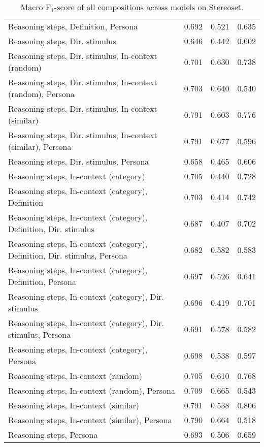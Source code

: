 \begin{table*}
\begin{tabular}{lrrr}
        Reasoning steps, Definition, Persona & 0.692 & 0.521 & 0.635 \\
        Reasoning steps, Dir. stimulus & 0.646 & 0.442 & 0.602 \\
        Reasoning steps, Dir. stimulus, In-context (random) & 0.701 & 0.630 & 0.738 \\
        Reasoning steps, Dir. stimulus, In-context (random), Persona & 0.703 & 0.640 & 0.540 \\
        Reasoning steps, Dir. stimulus, In-context (similar) & 0.791 & 0.603 & 0.776 \\
        Reasoning steps, Dir. stimulus, In-context (similar), Persona & 0.791 & 0.677 & 0.596 \\
        Reasoning steps, Dir. stimulus, Persona & 0.658 & 0.465 & 0.606 \\
        Reasoning steps, In-context (category) & 0.705 & 0.440 & 0.728 \\
        Reasoning steps, In-context (category), Definition & 0.703 & 0.414 & 0.742 \\
        Reasoning steps, In-context (category), Definition, Dir. stimulus & 0.687 & 0.407 & 0.702 \\
        Reasoning steps, In-context (category), Definition, Dir. stimulus, Persona & 0.682 & 0.582 & 0.583 \\
        Reasoning steps, In-context (category), Definition, Persona & 0.697 & 0.526 & 0.641 \\
        Reasoning steps, In-context (category), Dir. stimulus & 0.696 & 0.419 & 0.701 \\
        Reasoning steps, In-context (category), Dir. stimulus, Persona & 0.691 & 0.578 & 0.582 \\
        Reasoning steps, In-context (category), Persona & 0.698 & 0.538 & 0.597 \\
        Reasoning steps, In-context (random) & 0.705 & 0.610 & 0.768 \\
        Reasoning steps, In-context (random), Persona & 0.709 & 0.665 & 0.543 \\
        Reasoning steps, In-context (similar) & 0.791 & 0.538 & 0.806 \\
        Reasoning steps, In-context (similar), Persona & 0.790 & 0.664 & 0.518 \\
        Reasoning steps, Persona & 0.693 & 0.506 & 0.659 \\
        \bottomrule
    \end{tabular}

    \caption{Macro F$_1$-score of all compositions across models on Stereoset.}
    \label{tab:compositions-performance-stereoset}
\end{table*}
